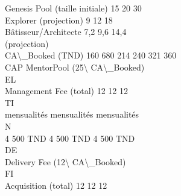 \documentclass[12pt,landscape,a4paper]{article}
\begin{document}
Genesis Pool (taille initiale)         15               20            30\\
Explorer (projection)                   9               12            18\\
Bâtisseur/Architecte                  7,2              9,6           14,4\\
(projection)\\
CA\textbackslash{}_Booked (TND)                     160 680          214 240       321 360\\
CAP MentorPool (25\textbackslash{}%
CA\textbackslash{}_Booked)\\
\vspace{0.5em}
\vspace{0.5em}
\vspace{0.5em}
\vspace{0.5em}
EL\\
Management Fee (total)                12                12            12\\
\vspace{0.5em}
\vspace{0.5em}
\vspace{0.5em}
\vspace{0.5em}
TI\\
mensualités       mensualités   mensualités\\
\vspace{0.5em}
\vspace{0.5em}
\vspace{0.5em}
\vspace{0.5em}
N\\
4 500 TND         4 500 TND     4 500 TND\\
\vspace{0.5em}
\vspace{0.5em}
\vspace{0.5em}
\vspace{0.5em}
DE\\
Delivery Fee (12\textbackslash{}%
CA\textbackslash{}_Booked)\\
\vspace{0.5em}
\vspace{0.5em}
\vspace{0.5em}
\vspace{0.5em}
FI\\
Acquisition (total)                   12                12            12\\
\end{document}
